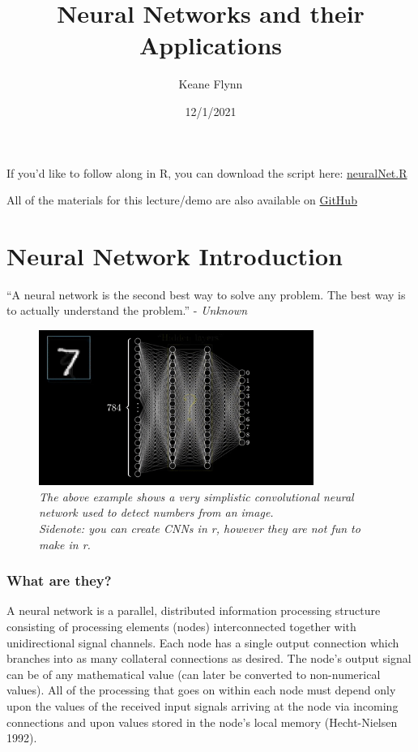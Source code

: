\documentclass[
]{article}
\title{Neural Networks and their Applications}
\author{Keane Flynn}
\date{12/1/2021}
\begin{document}
\maketitle

If you'd like to follow along in R, you can download the script here:
\url{neuralNet.R}

All of the materials for this lecture/demo are also available on
\href{https://github.com/keaneflynn/NeuralNetworks}{GitHub}

\hypertarget{neural-network-introduction}{%
\section{Neural Network
Introduction}\label{neural-network-introduction}}

``A neural network is the second best way to solve any problem. The best
way is to actually understand the problem.'' - \emph{Unknown}

\begin{figure}
\centering
\includegraphics[width=0.8\textwidth,height=\textheight]{media/neuralNet.gif}
\caption{\emph{The above example shows a very simplistic convolutional
neural network used to detect numbers from an image.\\
Sidenote: you can create CNNs in r, however they are not fun to make in
r.}}
\end{figure}

\hypertarget{what-are-they}{%
\subsubsection{What are they?}\label{what-are-they}}

A neural network is a parallel, distributed information processing
structure consisting of processing elements (nodes) interconnected
together with unidirectional signal channels. Each node has a single
output connection which branches into as many collateral connections as
desired. The node's output signal can be of any mathematical value (can
later be converted to non-numerical values). All of the processing that
goes on within each node must depend only upon the values of the
received input signals arriving at the node via incoming connections and
upon values stored in the node's local memory (Hecht-Nielsen 1992).
\end{document}
